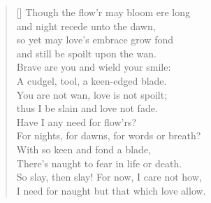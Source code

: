 \begin{verse}[\textwidth]
  Though the flow’r may bloom ere long\\
  \vin and night recede unto the dawn,\\
  so yet may love’s embrace grow fond\\
  \vin and still be spoilt upon the wan.\\
  Brave are you and wield your smile:\\
  \vin A cudgel, tool, a keen-edged blade.\\
  You are not wan, love is not spoilt;\\
  \vin thus I be slain and love not fade.\\
  Have I any need for flow'rs?\\
  \vin For nights, for dawns, for words or breath?\\
  With so keen and fond a blade,\\
  \vin There's naught to fear in life or death.\\
  \vin \vin So slay, then slay! For now, I care not how,\\
  \vin \vin I need for naught but that which love allow.
\end{verse}

